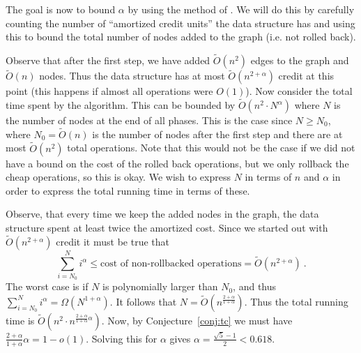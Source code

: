 \documentclass[a4paper,11pt]{article}
\newcommand{\Ot}{\tilde{O}}
\theoremstyle{definition}
\begin{document}
The goal is now to bound $\alpha$ by using the method of \cite{KopelowitzPP16}. We will do
this by carefully counting the number of ``amortized credit units'' the data
structure has and using this to bound the total number of nodes added to the
graph (i.e. not rolled back).

Observe that after the first step, we have added $\Ot(n^2)$ edges to the graph
and $\Ot(n)$ nodes. Thus the data structure has at most $\Ot(n^{2+\alpha})$
credit at this point (this happens if almost all operations were $O(1)$). Now
consider the total time spent by the algorithm. This can be bounded by
$\Ot(n^2\cdot N^\alpha)$ where $N$ is the number of nodes at the end of all
phases. This is the case since $N\ge N_0$, where $N_0 = \Ot(n)$ is the number
of nodes after the first step and there are at most $\Ot(n^2)$ total
operations. Note that this would not be the case if we did not have a bound on
the cost of the rolled back operations, but we only rollback the cheap
operations, so this is okay. We wish to express $N$ in terms of $n$ and
$\alpha$ in order to express the total running time in terms of these.

Observe, that every time we keep the added nodes in the graph, the data
structure spent at least twice the amortized cost. Since
we started out with $\Ot(n^{2+\alpha})$ credit it must be true that
\[
    \sum_{i=N_0}^N i^\alpha \le \text{cost of non-rollbacked operations} = \Ot(n^{2+\alpha})\ .
\]
The worst case is if $N$ is polynomially larger than $N_0$, and thus
$\sum_{i=N_0}^N i^\alpha = \Omega(N^{1+\alpha})$. It follows that $N =
\Ot(n^{\frac{2+\alpha}{1+\alpha}})$.
Thus the total running time is $\Ot(n^2\cdot n^{\frac{2+\alpha}{1+\alpha}\alpha})$. Now, by Conjecture~\ref{conj:tc} we must have $\frac{2+\alpha}{1+\alpha}\alpha
= 1 - o(1)$. Solving this for $\alpha$ gives $\alpha = \frac{\sqrt{5}-1}{2} <
0.618$.
\end{document}
